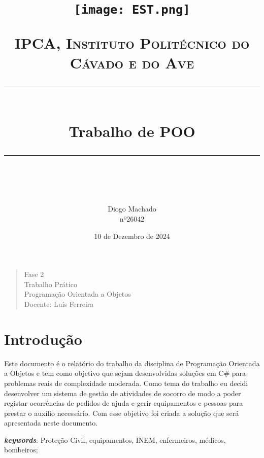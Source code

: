 \documentclass[11pt]{scrartcl} %
\title{
	\begin{figure}[h] %
		\centering
		\texttt{[image: EST.png]} %
	\end{figure}	
	\vspace{25pt} 
	\normalfont\normalsize
	\textsc{IPCA, Instituto Politécnico do Cávado e do Ave}\\ %
	\vspace{25pt} %
	\rule{\linewidth}{0.5pt}\\ %
	\vspace{20pt} %
	{\huge Trabalho de POO}\\ %
	\vspace{12pt} %
	\rule{\linewidth}{2pt}\\ %
	\vspace{12pt} %
}
\author{\LARGE Diogo Machado \\ nº26042} %
\date{\normalsize 10 de Dezembro de 2024} %
\begin{document}
\maketitle %


\begin{quote}
	\begin{center}
		Fase 2\\
		\vspace{12pt}
		Trabalho Prático\\
		\vspace{12pt} 
		Programação Orientada a Objetos\\
		\vspace{12pt}
		Docente: Luís Ferreira
	\end{center}	
\end{quote}
\newpage

\renewcommand{\contentsname}{Indice}
\tableofcontents

\newpage

\renewcommand\lstlistingname{Amostra de Código}
\renewcommand\lstlistlistingname{Amostras de Código}
\lstlistoflistings
\newpage

\section{Introdução}

Este documento é o relatório do trabalho da disciplina de Programação Orientada a Objetos e tem como objetivo que sejam desenvolvidas soluções em C\# para problemas reais de complexidade moderada. Como tema do trabalho eu decidi desenvolver um sistema de gestão de atividades de socorro de modo a poder registar ocorrências de pedidos de ajuda e gerir equipamentos e pessoas para prestar o auxílio necessário. Com esse objetivo foi criada a solução que será apresentada neste documento.

\textbf{\textit{keywords}}: Proteção Civil, equipamentos, INEM, enfermeiros, médicos, bombeiros;
\end{document}
